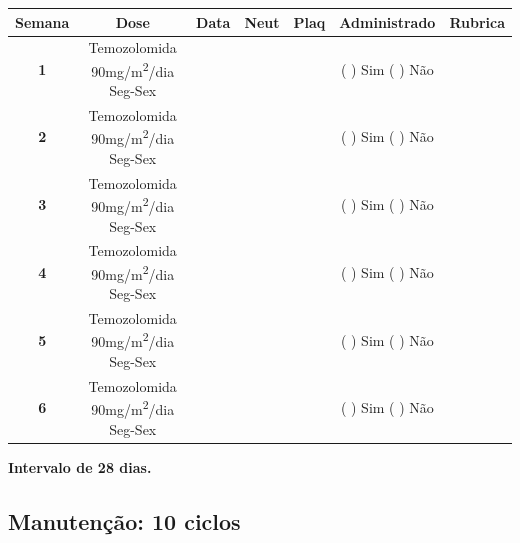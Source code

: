 \documentclass[11pt,a4paper,oldfontcommands]{memoir}
\begin{document}
\begin{center}
\begin{table}[H]
\begin{tabular}{p{1cm}c|c|c|c|c|c}
	\hline
\multicolumn{1}{c|}{\multirow{1}{*}{\textbf{Semana}}}&{Dose}&{Data}&{Neut}&{Plaq}&{Administrado}&{Rubrica} \\
    \hline
    \multicolumn{1}{c|}{\multirow{1}{*}{\textbf{1}}}&{Temozolomida 90mg/m\textsuperscript{2}/dia Seg-Sex}&{}&&&{(  ) Sim (  ) Não}&\\
    \cline{3-5}
    \multicolumn{1}{c|}{\multirow{1}{*}{{\textbf{2}}}}&{Temozolomida 90mg/m\textsuperscript{2}/dia Seg-Sex}&{}&&&{(  ) Sim (  ) Não}&\\
    \cline{3-5}
    \multicolumn{1}{c|}{\multirow{1}{*}{{\textbf{3}}}}&{Temozolomida 90mg/m\textsuperscript{2}/dia Seg-Sex}&{}&&&{(  ) Sim (  ) Não}&\\
    \cline{3-5}
    \multicolumn{1}{c|}{\multirow{1}{*}{{\textbf{4}}}}&{Temozolomida 90mg/m\textsuperscript{2}/dia Seg-Sex}&{}&&&{(  ) Sim (  ) Não}&\\
    \cline{3-5}
    \multicolumn{1}{c|}{\multirow{1}{*}{{\textbf{5}}}}&{Temozolomida 90mg/m\textsuperscript{2}/dia Seg-Sex}&{}&&&{(  ) Sim (  ) Não}&\\
    \cline{3-5}
    \multicolumn{1}{c|}{\multirow{1}{*}{{\textbf{6}}}}&{Temozolomida 90mg/m\textsuperscript{2}/dia Seg-Sex}&{}&&&{(  ) Sim (  ) Não}&\\
    \hline
\end{tabular}
\end{table}
\textbf{Intervalo de 28 dias.}
\end{center}
\pagebreak
\subsection{Manutenção: 10 ciclos}
\end{document}
